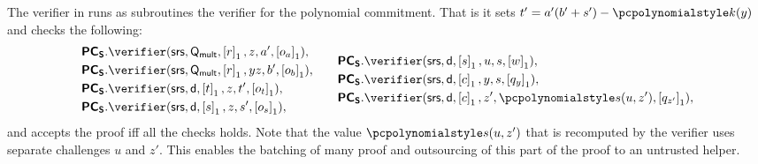  The verifier
in \sonic{} runs as subroutines the verifier for the polynomial commitment. That
is it sets $t' = a'(b' + s') - \p{k}(y)$ and checks the following:
\begin{equation*}
  \begin{split}
    &\PCOMs.\verifier(\srs, \multconstr, \gone{r}, z, a', \gone{o_a}), \\
    &\PCOMs.\verifier(\srs, \multconstr, \gone{r}, y z, b', \gone{o_b}),\\
    &\PCOMs.\verifier(\srs, \dconst, \gone{t}, z, t', \gone{o_t}),\\
    &\PCOMs.\verifier(\srs, \dconst, \gone{s}, z, s', \gone{o_s}),\\
  \end{split}
  \qquad
  \begin{split}
    &\PCOMs.\verifier(\srs, \dconst, \gone{s}, u, s, \gone{w}),\\
    &\PCOMs.\verifier(\srs, \dconst, \gone{c}, y, s, \gone{q_y}),\\
    &\PCOMs.\verifier(\srs, \dconst, \gone{c}, z', \p{s}(u, z'), \gone{q_{z'}}),
  \end{split}
\end{equation*}
and accepts the proof iff all the checks holds. Note that the value
$\p{s}(u, z')$ that is recomputed by the verifier uses separate challenges $u$
and $z'$. This enables the batching of many proof and outsourcing of this
part of the proof to an untrusted helper.

